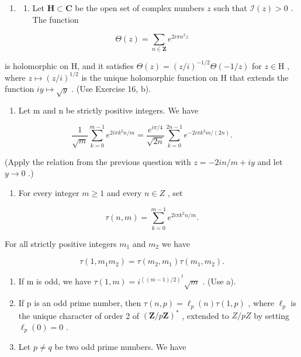 \begin{enumerate}
\def\labelenumi{\arabic{enumi})}
\setcounter{enumi}{59}
\tightlist
\item
  \begin{enumerate}
  \def\labelenumii{\alph{enumii})}
  \tightlist
  \item
    Let \(\mathbf{H} \subset \mathbf{C}\) be the open set of complex numbers \(z\) such that \(\mathcal{I}(z) > 0\) . The function
  \end{enumerate}
\end{enumerate}

\[
\Theta (z) = \sum_ {n \in \mathbf {Z}} e ^ {2 i \pi n ^ {2} z}
\]

is holomorphic on H, and it satisfies \(\Theta(z) = (z/i)^{-1/2}\Theta(-1/z)\) for \(z\in\mathrm{H}\) , where \(z\mapsto(z/i)^{1/2}\) is the unique holomorphic function on H that extends the function \(iy\mapsto\sqrt{y}\) . (Use Exercise 16, b).

\begin{enumerate}
\def\labelenumi{\alph{enumi})}
\setcounter{enumi}{1}
\tightlist
\item
  Let m and n be strictly positive integers. We have
\end{enumerate}

\[
\frac {1}{\sqrt {m}} \sum_ {k = 0} ^ {m - 1} e ^ {2 i \pi k ^ {2} n / m} = \frac {e ^ {i \pi / 4}}{\sqrt {2 n}} \sum_ {k = 0} ^ {2 n - 1} e ^ {- 2 i \pi k ^ {2} m / (2 n)}.
\]

(Apply the relation from the previous question with \(z = -2in / m + iy\) and let \(y \to 0\) .)

\begin{enumerate}
\def\labelenumi{\alph{enumi})}
\setcounter{enumi}{2}
\tightlist
\item
  For every integer \(m \geqslant 1\) and every \(n \in Z\) , set
\end{enumerate}

\[
\tau (n, m) = \sum_ {k = 0} ^ {m - 1} e ^ {2 i \pi k ^ {2} n / m}.
\]

For all strictly positive integers \(m_{1}\) and \(m_{2}\) we have

\[
\tau (1, m _ {1} m _ {2}) = \tau (m _ {2}, m _ {1}) \tau (m _ {1}, m _ {2}).
\]

\begin{enumerate}
\def\labelenumi{\alph{enumi})}
\setcounter{enumi}{3}
\item
  If m is odd, we have \(\tau(1,m)=i^{((m-1)/2)^{2}}\sqrt{m}\) . (Use a).
\item
  If p is an odd prime number, then \(\tau(n,p)=\ell_{p}(n)\tau(1,p)\) , where \(\ell_{p}\) is the unique character of order 2 of \((\mathbf{Z}/p\mathbf{Z})^{*}\) , extended to \(Z/pZ\) by setting \(\ell_{p}(0)=0\) .
\item
  Let \(p \neq q\) be two odd prime numbers. We have
\end{enumerate}

